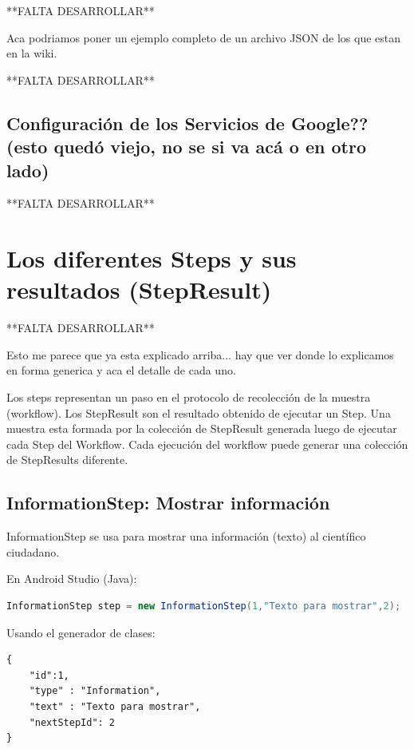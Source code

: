 **FALTA DESARROLLAR**

Aca podriamos poner un ejemplo completo de un archivo JSON de los que estan en la wiki.

**FALTA DESARROLLAR**

\subsection{Configuración de los Servicios de Google?? (esto quedó viejo, no se si va acá o en otro lado)}
**FALTA DESARROLLAR**

\section{Los diferentes Steps y sus resultados (StepResult)} \label{sec:steps_detallados}
**FALTA DESARROLLAR**

Esto me parece que ya esta explicado arriba... hay que ver donde lo explicamos en forma generica y aca el detalle de cada uno.

Los steps representan un paso en el protocolo de recolección de la muestra (workflow).
Los StepResult son el resultado obtenido de ejecutar un Step.
Una muestra esta formada por la colección de StepResult generada luego de ejecutar cada Step del Workflow. Cada ejecución del workflow puede generar una colección de StepResults diferente.

\subsection{InformationStep: Mostrar información}
InformationStep se usa para mostrar una información (texto) al científico ciudadano. 

En Android Studio (Java):
\begin{lstlisting}[language=Java, frame=tlb]	
InformationStep step = new InformationStep(1,"Texto para mostrar",2);
\end{lstlisting}

Usando el generador de clases:
\begin{lstlisting}[language=XML, frame=tlb]	
{
	"id":1,
	"type" : "Information",
	"text" : "Texto para mostrar",
	"nextStepId": 2
}
\end{lstlisting}

